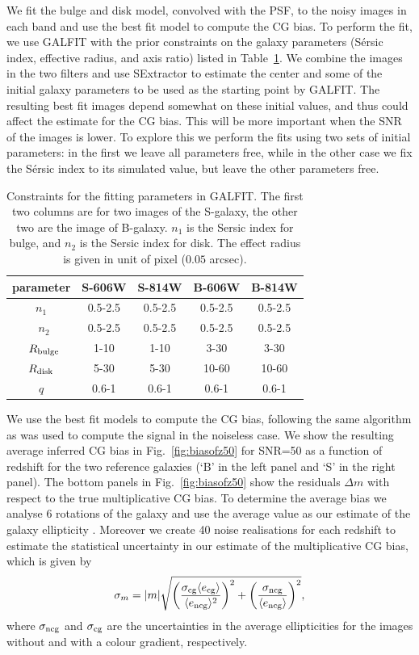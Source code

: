 \documentclass[useAMS,usenatbib]{mnras}
\newcommand{\be}{\begin{equation}}
\newcommand{\ee}{\end{equation}}
\newcommand{\rund}[1]{\left(#1\right)}
\def\elabel#1{\label{eq:#1}}
\begin{document}
We fit the bulge and disk model, convolved with the PSF, to  the noisy images in each band and use the best fit model to compute the CG bias. To perform the fit, we use {\sc GALFIT} \citep{Peng10} with 
the prior constraints on the galaxy parameters (S{\'e}rsic index, effective radius, and axis ratio) listed in Table~\ref{fitpar}. We combine the images in the two filters and use {\sc SExtractor} to estimate the center and some of the initial galaxy parameters to be used as the starting point by {\sc GALFIT}. The resulting best fit images depend somewhat on these initial values, and thus could affect the  estimate for the CG bias. This will be more important when the SNR of the images is lower. To explore this we perform the fits using two sets of initial parameters: in the first we leave all parameters free, while in the other case we fix the S{\'e}rsic index to its simulated value, but leave the other parameters free.
%
\begin{table}
\begin{center}
\begin{tabular}{ccc|cc}
\hline\hline
parameter &S-606W  & S-814W  & B-606W & B-814W \\ \hline
$n_1$ &0.5-2.5  &0.5-2.5  &0.5-2.5 &0.5-2.5 \\ \
$n_2$ &0.5-2.5  &0.5-2.5  &0.5-2.5 &0.5-2.5 \\ \
$R_{\rm bulge}$ &1-10 &1-10  &3-30  &3-30  \\ 
$R_{\rm disk}$  &5-30 &5-30  &10-60 &10-60 \\ 
$q$      &0.6-1  &0.6-1  &0.6-1 &0.6-1 \\ 
\hline
\end{tabular}
\caption{\label{fitpar} Constraints for the fitting parameters in {\sc GALFIT}.
The first two columns are for two images of the S-galaxy, the other two are
the image of B-galaxy.
$n_1$ is the Sersic index for bulge, and $n_2$ is the Sersic index for disk.
The effect radius is given in unit of pixel ($0.05$ arcsec).}
\end{center}
\end{table}

We use the best fit models to compute the CG bias, following the same algorithm as was used to compute the signal in the noiseless case. We show the resulting average inferred CG bias in Fig.~\ref{fig:biasofz50} for SNR=50 as a function of redshift for the two reference galaxies (`B' in the left panel and `S' in the
right panel). The bottom panels in Fig.~\ref{fig:biasofz50} show the residuals 
$\Delta m$ with respect to the true multiplicative CG bias. To  determine the average
bias we analyse 6 rotations of the galaxy and use the average value as our estimate of 
the galaxy ellipticity \citep{Nakajima07}.  Moreover we create 40 noise realisations for 
each redshift to estimate the statistical uncertainty in our estimate of the multiplicative
CG bias, which is given by
%
\be
\sigma_m= |m| \sqrt{\rund{\sigma_{\rm cg} \langle e_{\rm cg} \rangle \over \langle e_{\rm ncg}\rangle^2 }^2
  + \rund{\sigma_{\rm ncg} \over \langle e_{\rm ncg} \rangle}^2 },
\elabel{sigmam}
\ee
%
where $\sigma_{\rm ncg}$ and $\sigma_{\rm cg}$ are the uncertainties in the average
ellipticities for the images without and with a colour gradient, respectively.
\end{document}
